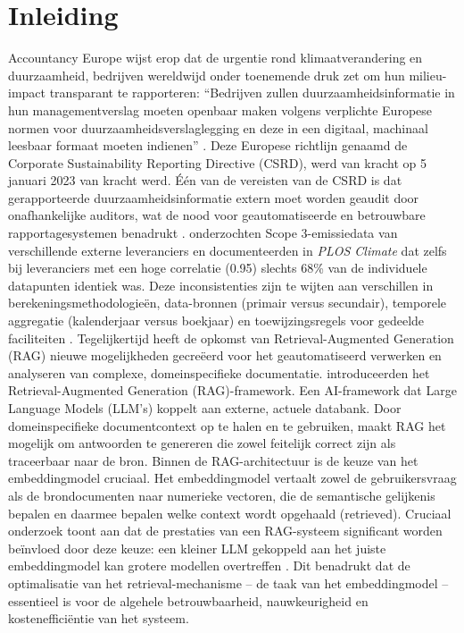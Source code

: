 \section{Inleiding}
\label{sec:inleiding}

Accountancy Europe wijst erop dat de urgentie rond klimaatverandering en duurzaamheid, bedrijven wereldwijd onder toenemende druk zet om hun milieu-impact transparant te rapporteren: ``Bedrijven zullen duurzaamheidsinformatie in hun managementverslag moeten openbaar maken volgens verplichte Europese normen voor duurzaamheidsverslaglegging en deze in een digitaal, machinaal leesbaar formaat moeten indienen'' \autocite{AccountancyEurope2024}. Deze Europese richtlijn genaamd de Corporate Sustainability Reporting Directive (CSRD), werd van kracht op 5 januari 2023 van kracht werd. \'{E}\'{e}n van de vereisten van de CSRD is dat gerapporteerde duurzaamheidsinformatie extern moet worden geaudit door onafhankelijke auditors, wat de nood voor geautomatiseerde en betrouwbare rapportagesystemen benadrukt \autocite{EuropeanCommission2024}.
\textcite{Nguyen2023} onderzochten Scope 3-emissiedata van verschillende externe leveranciers en documenteerden in \emph{PLOS Climate} dat zelfs bij leveranciers met een hoge correlatie (0.95) slechts 68\% van de individuele datapunten identiek was. Deze inconsistenties zijn te wijten aan verschillen in berekenings\-me\-tho\-do\-lo\-gie\"en, data-bronnen (primair versus secundair), temporele aggregatie (kalenderjaar versus boekjaar) en toewijzingsregels voor gedeelde faciliteiten \autocite{Nguyen2023}.
Tegelijkertijd heeft de opkomst van Retrieval-Augmented Generation (RAG) nieuwe mogelijkheden gecre\"eerd voor het geautomatiseerd verwerken en analyseren van complexe, domeinspecifieke documentatie. \textcite{Lewis2020} introduceerden het Retrieval-Augmented Generation (RAG)-framework. Een AI-framework dat Large Language Models (LLM's) koppelt aan externe, actuele databank. Door domeinspecifieke documentcontext op te halen en te gebruiken, maakt RAG het mogelijk om antwoorden te genereren die zowel feitelijk correct zijn als traceerbaar naar de bron.
Binnen de RAG-architectuur is de keuze van het embeddingmodel cruciaal. Het embeddingmodel vertaalt zowel de gebruikersvraag als de brondocumenten naar numerieke vectoren, die de semantische gelijkenis bepalen en daarmee bepalen welke context wordt opgehaald (retrieved). Cruciaal onderzoek toont aan dat de prestaties van een RAG-systeem significant worden beïnvloed door deze keuze: een kleiner LLM gekoppeld aan het juiste embeddingmodel kan grotere modellen overtreffen \autocite{Canale2025}. Dit benadrukt dat de optimalisatie van het retrieval-mechanisme – de taak van het embeddingmodel – essentieel is voor de algehele betrouwbaarheid, nauwkeurigheid en kosteneffici\"entie van het systeem.

